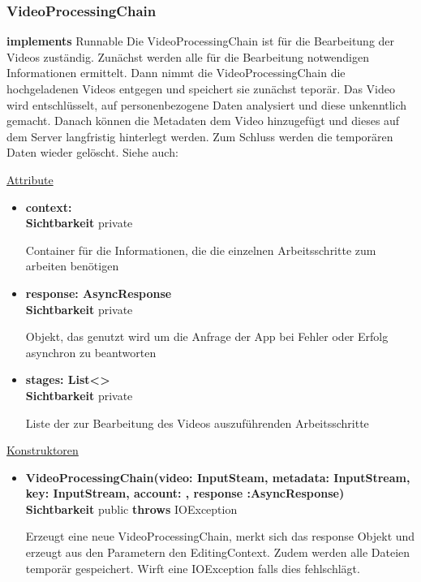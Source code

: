 \subsubsection{VideoProcessingChain} \label{service:klasse:VideoProcessingChain}
\textbf{implements} Runnable \newline
Die VideoProcessingChain ist für die Bearbeitung der Videos zuständig. Zunächst werden alle für die Bearbeitung notwendigen Informationen ermittelt. Dann nimmt die VideoProcessingChain die hochgeladenen Videos entgegen und speichert sie zunächst teporär. Das Video wird entschlüsselt, auf personenbezogene Daten analysiert und diese unkenntlich gemacht. Danach können die Metadaten dem Video hinzugefügt und dieses auf dem Server langfristig hinterlegt werden. Zum Schluss werden die temporären Daten wieder gelöscht.\newline
Siehe auch: 

\underline{Attribute}
\begin{itemize}
\itemsep0pt
\item \textbf{context: } \hfill\\ 
\textbf{Sichtbarkeit} private

Container für die Informationen, die die einzelnen Arbeitsschritte zum arbeiten benötigen

\item \textbf{response: AsyncResponse} \hfill\\ 
\textbf{Sichtbarkeit} private

Objekt, das genutzt wird um die Anfrage der App bei Fehler oder Erfolg asynchron zu beantworten

\item \textbf{stages: List<>} \hfill\\ 
\textbf{Sichtbarkeit} private

Liste der zur Bearbeitung des Videos auszuführenden Arbeitsschritte
\end{itemize}

\underline{Konstruktoren}
\begin{itemize}
\itemsep0pt
\item \textbf{VideoProcessingChain(video: InputSteam, metadata: InputStream, 
key: InputStream, account: , response :AsyncResponse)} \hfill\\
\textbf{Sichtbarkeit} public \newline
\textbf{throws} IOException

Erzeugt eine neue VideoProcessingChain, merkt sich das response Objekt und erzeugt aus den Parametern den EditingContext. Zudem werden alle Dateien temporär gespeichert. Wirft eine IOException falls dies fehlschlägt.
\end{itemize}

